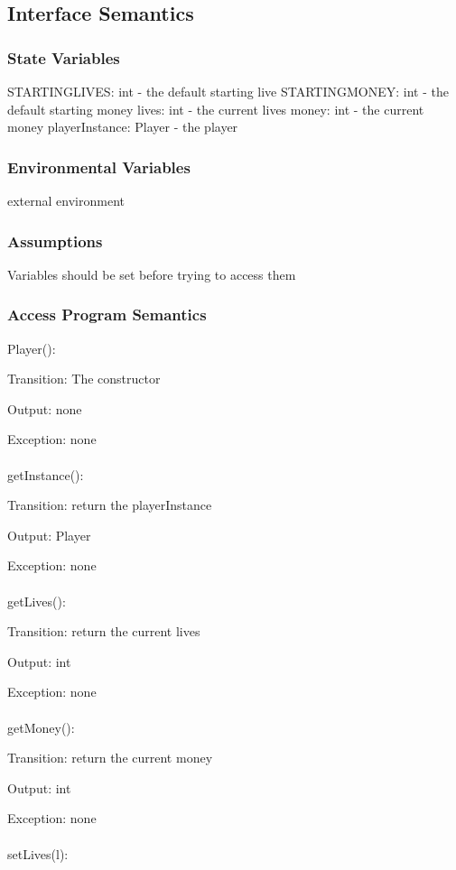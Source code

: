 \documentclass[12,english]{article}
\begin{document}
		\subsection{Interface Semantics}
			\subsubsection{State Variables}
			STARTINGLIVES: int - the default starting live
			STARTINGMONEY: int - the default starting money
			lives: int - the current lives
			money: int - the current money
			playerInstance: Player - the player
			
			\subsubsection{Environmental Variables}
			\color{red} external environment \color{black}
			
			\subsubsection{Assumptions}
			Variables should be set before trying to access them
			
			\subsubsection{Access Program Semantics}
			Player():
			
			Transition: The constructor
			
			Output: none
			
			Exception: none\\
			\\
			getInstance():
			
			Transition: return the playerInstance
			
			Output: Player
			
			Exception: none\\
			\\
			getLives():
			
			Transition: return the current lives
			
			Output: int
			
			Exception: none\\
			\\
			getMoney():
			
			Transition: return the current money
			
			Output: int
			
			Exception: none\\
			\\
			setLives(l):
			
\end{document}
